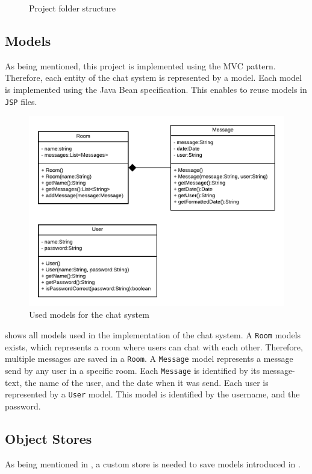 \begin{figure}[h]
\caption{Project folder structure}
\label{fig:03_impl_structure}
\end{figure}


\subsection{Models}\label{subsec:03_impl_models}
As being mentioned, this project is implemented using the MVC pattern. Therefore, each entity of the chat system is represented by a model.
Each model is implemented using the Java Bean specification. This enables to reuse models in \texttt{JSP} files.
\begin{figure}[h]
\centering
\includegraphics[scale=0.8]{images/03_impl/models}
\caption{Used models for the chat system}
\label{fig:03_impl_models_models}
\end{figure}
 shows all models used in the implementation of the chat system.
A \texttt{Room} models exists, which represents a room where users can chat with each other. Therefore, multiple messages are saved in a \texttt{Room}. A \texttt{Message} model represents a message send by any user in a specific room. Each \texttt{Message} is identified by its message-text, the name of the user, and the date when it was send.
Each user is represented by a \texttt{User} model. This model is identified by the username, and the password.


\subsection{Object Stores}\label{subsec:03_impl_objstores}
As being mentioned in , a custom store is needed to save models introduced in .

